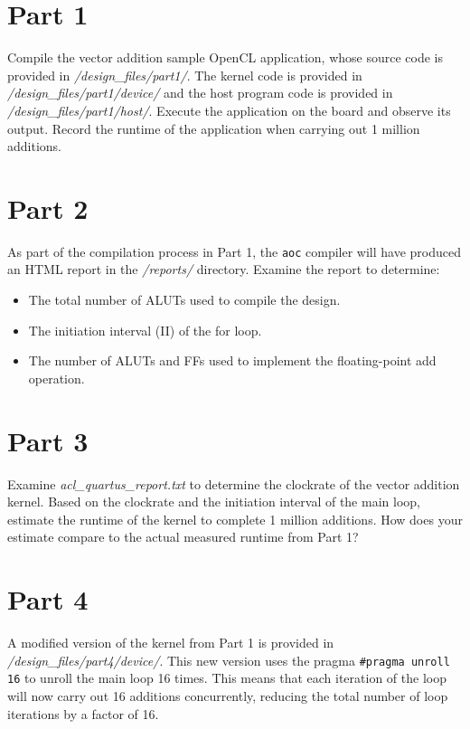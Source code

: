 \documentclass[epsfig,10pt,fullpage]{article}
\begin{document}
\section*{Part 1}

Compile the vector addition sample OpenCL application, whose source code is provided in \textit{/design\_files/part1/}. 
The kernel code is provided in \textit{/design\_files/part1/device/} and the host program code is provided in \textit{/design\_files/part1/host/}. Execute the application on the board and observe its output. Record the runtime of the application when carrying out 1 million additions.

\section*{Part 2}

As part of the compilation process in Part 1, the \texttt{aoc} compiler will have produced an HTML report in the \textit{/reports/} directory. Examine the report to determine:

\begin{itemize}
\item The total number of ALUTs used to compile the design.
\item The initiation interval (II) of the for loop.
\item The number of ALUTs and FFs used to implement the floating-point add operation.
\end{itemize} 

\section*{Part 3}

Examine \textit{acl\_quartus\_report.txt} to determine the clockrate of the vector addition kernel. Based on the clockrate
and the initiation interval of the main loop, estimate the runtime of the kernel to complete 1 million additions. How does your estimate compare to the actual measured runtime from Part 1?

\section*{Part 4}

A modified version of the kernel from Part 1 is provided in \textit{/design\_files/part4/device/}. This new version uses the pragma \texttt{\#pragma unroll 16} to unroll the main loop 16 times. This means that each iteration of the loop will now carry out 16 additions concurrently, reducing the total number of loop iterations by a factor of 16.
\end{document}
